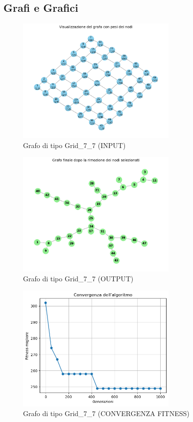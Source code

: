 \documentclass[a4paper,12pt]{article}
\begin{document}
\subsection{Grafi e Grafici}
\begin{figure}[H]
\centering
\includegraphics[width=0.7\textwidth]{img/grafo_grid_7_7.png}
\caption{Grafo di tipo Grid\_7\_7 (INPUT)}
\end{figure}
\begin{figure}[H]
\centering
\includegraphics[width=0.7\textwidth]{img/grafoAciclico_grid_7_7.png}
\caption{Grafo di tipo Grid\_7\_7 (OUTPUT)}
\end{figure}
\begin{figure}[H]
\centering
\includegraphics[width=0.7\textwidth]{img/convergenza_grid_7_7.png}
\caption{Grafo di tipo Grid\_7\_7 (CONVERGENZA FITNESS)}
\end{figure}
\end{document}

